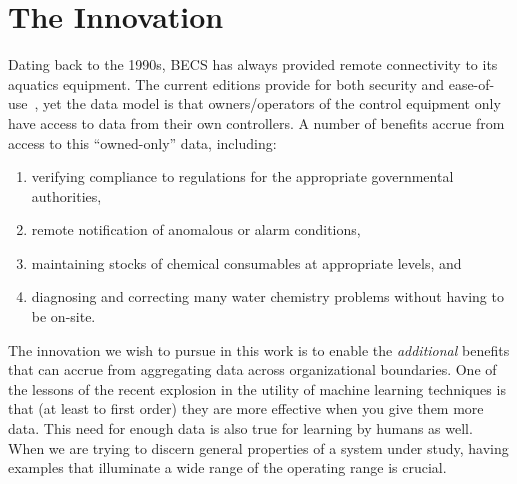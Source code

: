 \section{The Innovation}
\label{sec:innovation}

%

Dating back to the 1990s, BECS has always provided remote connectivity
to its aquatics equipment.  The current editions provide for both
security and ease-of-use~\cite{ccgss16,ccgss17b}, yet the data model
is that owners/operators of the control equipment only have access to
data from their own controllers.
A number of benefits accrue from access to this ``owned-only'' data,
including:
\begin{enumerate}
\item verifying compliance to regulations for the appropriate
governmental authorities,
\item remote notification of anomalous or alarm conditions,
\item maintaining stocks of chemical consumables at appropriate levels, and
\item diagnosing and correcting many water chemistry problems without
having to be on-site.
\end{enumerate}

The innovation we wish to pursue in this work is to enable
the \emph{additional} benefits that can accrue from aggregating data
across organizational boundaries.
One of the lessons of the recent explosion in the utility of machine
learning techniques is that (at least to first order) they are more
effective when you give them more data.  This need for enough data is
also true for learning by humans as well.  When we are trying to discern
general properties of a system under study, having examples that
illuminate a wide range of the operating range is crucial.

